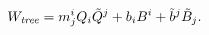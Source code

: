 \begin{equation}
  W_{\it tree} = m^i_{j} Q_i \tilde{Q}^{{j}}
  + b_i B^i + \tilde{b}^{{j}} \tilde{B}_{{j}}.
\label{w-tree}
\end{equation}

